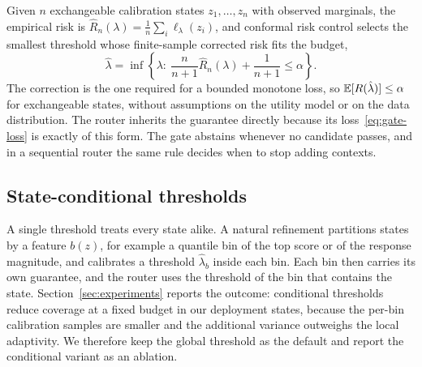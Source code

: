 Given $n$ exchangeable calibration states $z_1,\ldots,z_n$ with observed
marginals, the empirical risk is
$\widehat R_n(\lambda)=\frac1n\sum_i \ell_\lambda(z_i)$, and conformal risk
control selects the smallest threshold whose finite-sample corrected risk
fits the budget,
\begin{equation}
 \hat\lambda=\inf\left\{\lambda:\
 \frac{n}{n+1}\widehat R_n(\lambda)+\frac{1}{n+1}\le\alpha\right\}.
 \label{eq:crc}
\end{equation}
The correction is the one required for a bounded monotone loss, so
$\mathbb{E}[R(\hat\lambda)]\le\alpha$ for exchangeable states, without assumptions on
the utility model or on the data distribution. The router inherits the
guarantee directly because its loss~\eqref{eq:gate-loss} is exactly of this
form. The gate abstains whenever no candidate passes, and in a sequential
router the same rule decides when to stop adding contexts.

\subsection{State-conditional thresholds}

A single threshold treats every state alike. A natural refinement partitions
states by a feature $b(z)$, for example a quantile bin of the top score or of
the response magnitude, and calibrates a threshold $\hat\lambda_b$ inside each
bin. Each bin then carries its own guarantee, and the router uses the
threshold of the bin that contains the state. Section~\ref{sec:experiments}
reports the outcome: conditional thresholds reduce coverage at a fixed budget
in our deployment states, because the per-bin calibration samples are smaller
and the additional variance outweighs the local adaptivity. We therefore keep
the global threshold as the default and report the conditional variant as an
ablation.
